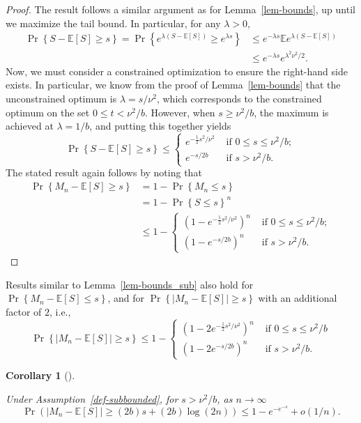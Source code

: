 \documentclass[
  12pt]{article}
\newcommand{\E}{\mathbb{E}}
\theoremstyle{plain}
\theoremstyle{plain}
\newtheorem{corollary}{Corollary}[section]
\theoremstyle{definition}
\theoremstyle{plain}
\theoremstyle{remark}
\begin{document}
\begin{proof}
The result follows a similar argument as for Lemma~\ref{lem-bounds}, up
until we maximize the tail bound. In particular, for any \(\lambda>0\),
\begin{align*}
  \Pr\left\{ S-\E[S]\ge s\right\} =
  \Pr\left\{e^{\lambda (S-\E[S])}\ge e^{\lambda s}\right\}
    & \le e^{-\lambda s}\E e^{\lambda (S-\E[S])} \\
    & \le e^{-\lambda s}e^{\lambda^2\nu^2/2}.
\end{align*} Now, we must consider a constrained optimization to ensure
the right-hand side exists. In particular, we know from the proof of
Lemma~\ref{lem-bounds} that the unconstrained optimum is
\(\lambda=s/\nu^2\), which corresponds to the constrained optimum on the
set \(0\le t<\nu^2/b\). However, when \(s\ge \nu^2/b\), the maximum is
achieved at \(\lambda=1/b\), and putting this together yields \[
  \Pr\left\{S-\E[S]\ge s\right\}\le
  \begin{cases}
    e^{-\frac{1}{2}s^2/\nu^2} & \text{ if }0\le s\le \nu^2/b; \\
    e^{-s/2b}                 & \text{ if } s>\nu^2/b.
  \end{cases}
\] The stated result again follows by noting that \begin{align*}
  \Pr\left\{M_n-\E[S]\ge s\right\}
    & = 1-\Pr\left\{M_n\le s\right\} \\
    & = 1-\Pr\left\{S\le s\right\}^n \\
    & \le 1-
  \begin{cases}
    (1-e^{-\frac{1}{2}s^2/\nu^2})^n & \text{ if } 0\le s\le \nu^2/b; \\
    (1-e^{-s/2b})^n                 & \text{ if } s>\nu^2/b.
  \end{cases}
\end{align*}
\end{proof}

Results similar to Lemma~\ref{lem-bounds_sub} also hold for
\(\Pr\left\{M_n-\E[S]\le s\right\}\), and for
\(\Pr\left\{|M_n-\E[S]|\ge s\right\}\) with an additional factor of
\(2\), i.e., \[
\Pr\left\{|M_n-\E[S]|\ge s\right\}\le 1-
\begin{cases}
  (1-2e^{-\frac{1}{2}s^2/\nu^2})^n & \text{ if }0\le s\le \nu^2/b \\
  (1-2e^{-s/2b})^n                 & \text{ if }s>\nu^2/b.
\end{cases}
\]

\begin{corollary}[]\protect\hypertarget{cor-two}{}\label{cor-two}

Under Assumption~\ref{def-subbounded}, for \(s>\nu^2/b\), as
\(n\rightarrow\infty\) \[
    \Pr\left(|M_n-\E[S]|\ge (2b)s+(2b)\log(2n)\right)\le 1-e^{-e^{-s}}+o(1/n).
\]

\end{corollary}
\end{document}
